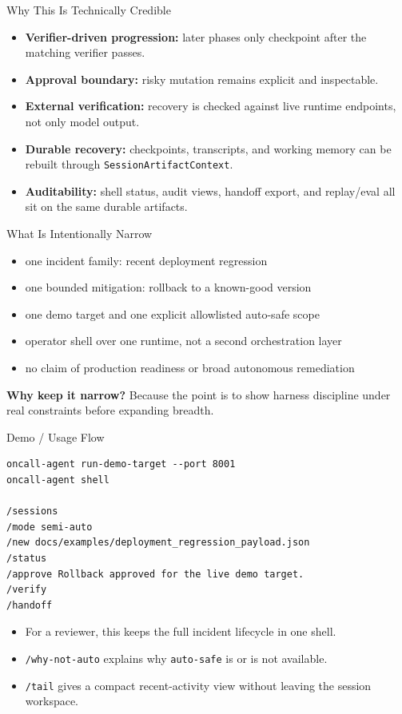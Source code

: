\documentclass[aspectratio=169]{beamer}
\begin{document}
\begin{frame}{Why This Is Technically Credible}
  \begin{itemize}
    \item \textbf{Verifier-driven progression:} later phases only checkpoint after the matching
      verifier passes.
    \item \textbf{Approval boundary:} risky mutation remains explicit and inspectable.
    \item \textbf{External verification:} recovery is checked against live runtime endpoints, not
      only model output.
    \item \textbf{Durable recovery:} checkpoints, transcripts, and working memory can be rebuilt
      through \texttt{SessionArtifactContext}.
    \item \textbf{Auditability:} shell status, audit views, handoff export, and replay/eval all
      sit on the same durable artifacts.
  \end{itemize}
\end{frame}

\begin{frame}{What Is Intentionally Narrow}
  \begin{itemize}
    \item one incident family: recent deployment regression
    \item one bounded mitigation: rollback to a known-good version
    \item one demo target and one explicit allowlisted auto-safe scope
    \item operator shell over one runtime, not a second orchestration layer
    \item no claim of production readiness or broad autonomous remediation
  \end{itemize}

  \vspace{0.6em}
  \textbf{Why keep it narrow?} Because the point is to show harness discipline under real
  constraints before expanding breadth.
\end{frame}

\begin{frame}[fragile]{Demo / Usage Flow}
  \small
  \begin{verbatim}
oncall-agent run-demo-target --port 8001
oncall-agent shell

/sessions
/mode semi-auto
/new docs/examples/deployment_regression_payload.json
/status
/approve Rollback approved for the live demo target.
/verify
/handoff
  \end{verbatim}

  \begin{itemize}
    \item For a reviewer, this keeps the full incident lifecycle in one shell.
    \item \texttt{/why-not-auto} explains why \texttt{auto-safe} is or is not available.
    \item \texttt{/tail} gives a compact recent-activity view without leaving the session workspace.
  \end{itemize}
\end{frame}
\end{document}
